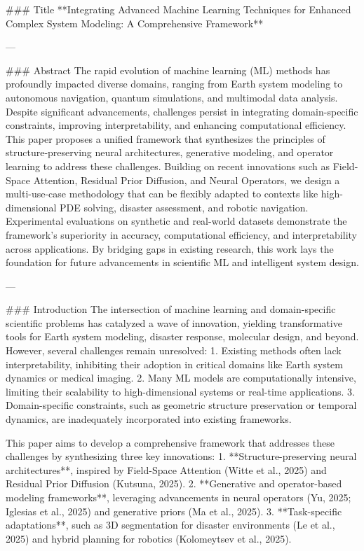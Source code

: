 ### Title  
**Integrating Advanced Machine Learning Techniques for Enhanced Complex System Modeling: A Comprehensive Framework**

---

### Abstract  
The rapid evolution of machine learning (ML) methods has profoundly impacted diverse domains, ranging from Earth system modeling to autonomous navigation, quantum simulations, and multimodal data analysis. Despite significant advancements, challenges persist in integrating domain-specific constraints, improving interpretability, and enhancing computational efficiency. This paper proposes a unified framework that synthesizes the principles of structure-preserving neural architectures, generative modeling, and operator learning to address these challenges. Building on recent innovations such as Field-Space Attention, Residual Prior Diffusion, and Neural Operators, we design a multi-use-case methodology that can be flexibly adapted to contexts like high-dimensional PDE solving, disaster assessment, and robotic navigation. Experimental evaluations on synthetic and real-world datasets demonstrate the framework's superiority in accuracy, computational efficiency, and interpretability across applications. By bridging gaps in existing research, this work lays the foundation for future advancements in scientific ML and intelligent system design.

---

### Introduction  
The intersection of machine learning and domain-specific scientific problems has catalyzed a wave of innovation, yielding transformative tools for Earth system modeling, disaster response, molecular design, and beyond. However, several challenges remain unresolved:  
1. Existing methods often lack interpretability, inhibiting their adoption in critical domains like Earth system dynamics or medical imaging.  
2. Many ML models are computationally intensive, limiting their scalability to high-dimensional systems or real-time applications.  
3. Domain-specific constraints, such as geometric structure preservation or temporal dynamics, are inadequately incorporated into existing frameworks.  

This paper aims to develop a comprehensive framework that addresses these challenges by synthesizing three key innovations:  
1. **Structure-preserving neural architectures**, inspired by Field-Space Attention (Witte et al., 2025) and Residual Prior Diffusion (Kutsuna, 2025).  
2. **Generative and operator-based modeling frameworks**, leveraging advancements in neural operators (Yu, 2025; Iglesias et al., 2025) and generative priors (Ma et al., 2025).  
3. **Task-specific adaptations**, such as 3D segmentation for disaster environments (Le et al., 2025) and hybrid planning for robotics (Kolomeytsev et al., 2025).  

